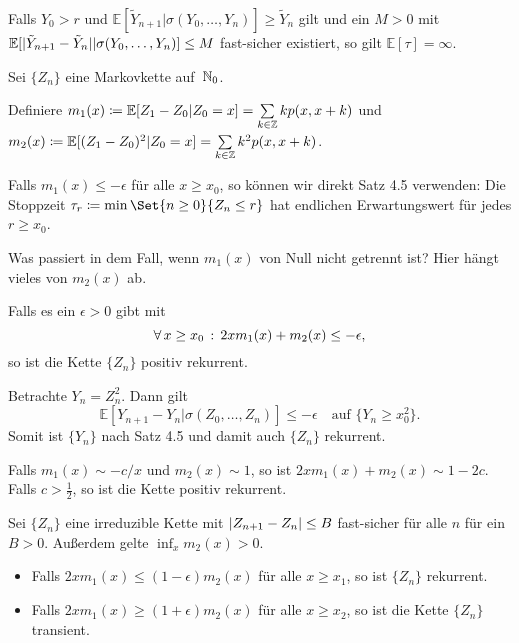 \documentclass{cheat-sheet}
\newcommand{\E}{\mathbb{E}} %
\begin{document}
\begin{satz}
  Falls $Y_0 > r$ und $\E[ \tilde{Y}_{n+1} | \sigma(Y_0, \ldots, Y_n) ] \geq \tilde{Y}_n$ gilt und ein $M > 0$ mit $\E[ \abs{\tilde{Y}_{n+1} - \tilde{Y}_n} | \sigma(Y_0, \ldots, Y_n) ] \leq M$ fast-sicher existiert, so gilt $\E[ \tau ] = \infty$.
\end{satz}



Sei $\{ Z_n \}$ eine Markovkette auf~$\mathbb{N}_0$.

Definiere $m_1(x) \coloneqq \E[ Z_1 - Z_0 | Z_0 = x ] = \sum_{k \in \Z} k p(x, x + k)$ und $m_2(x) \coloneqq \E[ (Z_1 - Z_0)^2 | Z_0 = x ] = \sum_{k \in \Z} k^2 p(x, x + k)$.

\begin{bem}
  Falls $m_1(x) \leq - \epsilon$ für alle $x \geq x_0$, so können wir direkt Satz 4.5 verwenden:
  Die Stoppzeit $\tau_r \coloneqq \min \Set{n \geq 0}{Z_n \leq r}$ hat endlichen Erwartungswert für jedes $r \geq x_0$.
\end{bem}

\begin{frage}
  Was passiert in dem Fall, wenn $m_1(x)$ von Null nicht getrennt ist? Hier hängt vieles von $m_2(x)$ ab.
\end{frage}

\begin{satz}
  Falls es ein $\epsilon > 0$ gibt mit
  \[
    \forall \, {x \geq x_0} \,:\, 2 x m_1(x) + m_2(x) \leq - \epsilon,
  \]
  so ist die Kette $\{ Z_n \}$ positiv rekurrent.
\end{satz}

\begin{beweisidee}
  Betrachte $Y_n = Z_n^2$.
  Dann gilt
  \[
    \E[ Y_{n+1} - Y_n | \sigma(Z_0, \ldots, Z_n) ] \leq - \epsilon
    \quad
    \text{auf } \{ Y_n \geq x_0^2 \}.
  \]
  Somit ist $\{ Y_n \}$ nach Satz 4.5 und damit auch $\{ Z_n \}$ rekurrent.
\end{beweisidee}

Falls $m_1(x) \sim - c / x$ und $m_2(x) \sim 1$, so ist $2 x m_1(x) + m_2(x) \sim 1 - 2 c$.
Falls $c > \tfrac{1}{2}$, so ist die Kette positiv rekurrent.

\begin{satz}
  Sei $\{ Z_n \}$ eine irreduzible Kette mit
  $\lvert Z_{n+1} - Z_n\rvert \leq B$ fast-sicher für alle $n$ für ein $B > 0$.
  Außerdem gelte $\inf_{x} m_2(x) > 0$.
  \begin{itemize}
    \item Falls $2 x m_1(x) \leq (1-\epsilon) m_2(x)$ für alle $x \geq x_1$, so ist $\{ Z_n \}$ rekurrent.
    \item Falls $2 x m_1(x) \geq (1 + \epsilon) m_2(x)$ für alle $x \geq x_2$, so ist die Kette $\{ Z_n \}$ transient.
  \end{itemize}
\end{satz}
\end{document}
